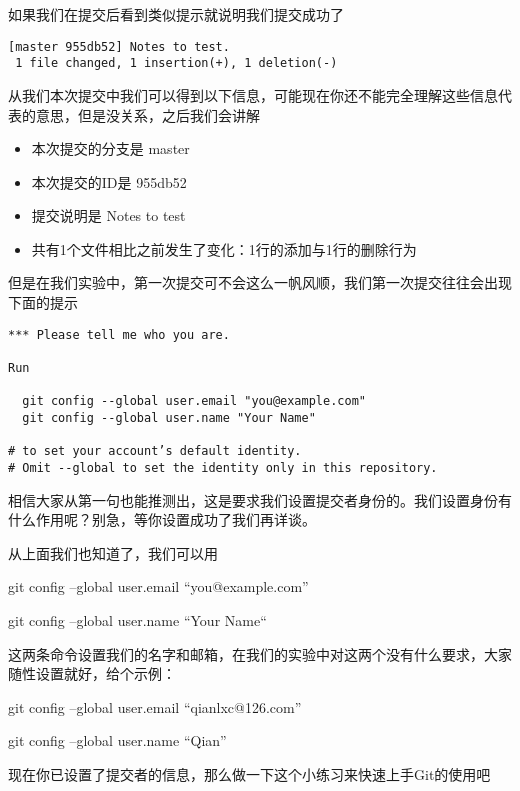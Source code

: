 如果我们在提交后看到类似提示就说明我们提交成功了

\begin{verbatim}
[master 955db52] Notes to test.
 1 file changed, 1 insertion(+), 1 deletion(-)
\end{verbatim}
从我们本次提交中我们可以得到以下信息，可能现在你还不能完全理解这些信息代表的意思，但是没关系，之后我们会讲解

\begin{itemize}
\item 本次提交的分支\label{分支}是 master
\item 本次提交的ID是 955db52
\item 提交说明是 Notes to test
\item 共有1个文件相比之前发生了变化：1行的添加与1行的删除行为
\end{itemize}

但是在我们实验中，第一次提交可不会这么一帆风顺，我们第一次提交往往会出现下面的提示

\begin{verbatim}
*** Please tell me who you are.

Run

  git config --global user.email "you@example.com"
  git config --global user.name "Your Name"

# to set your account’s default identity.
# Omit --global to set the identity only in this repository.
\end{verbatim}

相信大家从第一句也能推测出，这是要求我们设置提交者身份的。我们设置身份有什么作用呢？别急，等你设置成功了我们再详谈。

\begin{note}
从上面我们也知道了，我们可以用  

  git config --global user.email “you@example.com”
  
  git config --global user.name “Your Name“
  
这两条命令设置我们的名字和邮箱，在我们的实验中对这两个没有什么要求，大家随性设置就好，给个示例：

  git config --global user.email “qianlxc@126.com”
  
  git config --global user.name “Qian”
\end{note}

现在你已设置了提交者的信息，那么做一下这个小练习来快速上手Git的使用吧

